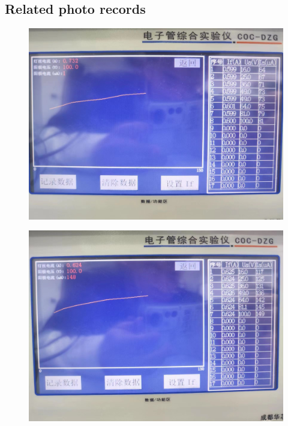 \documentclass[UTF8]{article}
\begin{document}
\begin{appendix}
\section{Related photo records}
\begin{figure}[H]
            	\centering
            	\includegraphics[clip,scale=0.2,trim={0 0 0 0}]{fig/fig16.jpg}
            	\label{figure.16}
\end{figure}
\begin{figure}[H]
            	\centering
            	\includegraphics[clip,scale=0.2,trim={0 0 0 0}]{fig/fig17.jpg}
            	\label{figure.15}
\end{figure}
\begin{figure}[H]
            	\centering

\end{figure}
\end{appendix}
\end{document}
